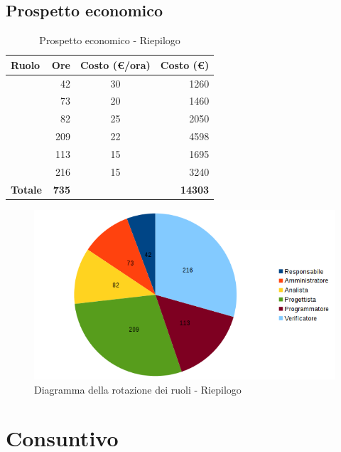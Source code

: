 \documentclass[12pt,a4paper]{article}
\begin{document}
\subsection{Prospetto economico}

\begin{table}[H]
	\begin{center}
		\begin{tabular}{l r c r}
			\toprule
			\textbf{Ruolo}	& \textbf{Ore} & \textbf{Costo (\euro/ora)}	& \textbf{Costo (\euro)} \\ \midrule
			\midrule
			\RE & 42 & 30 & 1260 \\ \midrule
			\AM & 73 & 20 & 1460 \\ \midrule
			\AN & 82 & 25 & 2050 \\ \midrule
			\PG & 209 & 22 & 4598 \\ \midrule
			\PR & 113 & 15 & 1695 \\ \midrule
			\VR & 216 & 15 & 3240 \\ \midrule
			\textbf{Totale} & \textbf{735} &  & \textbf{14303} \\
			\bottomrule
		\end{tabular}
		\caption{Prospetto economico - Riepilogo}
	\end{center}
\end{table}

\begin{center}
	\begin{figure}[H]
		\centering \includegraphics[width=\textwidth]{diagrammaTortaRiepilogoTotaleOre.png}
		\caption{Diagramma della rotazione dei ruoli - Riepilogo}
	\end{figure}
\end{center}

\newpage

\section{Consuntivo}
\end{document}

